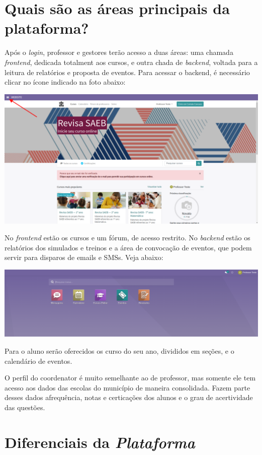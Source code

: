 \section{Quais são as áreas principais da plataforma?}

Após o \textit{login}, professor e gestores terão acesso a duas áreas: uma chamada \textit{frontend}, 
dedicada totalment aos cursos, e outra chada de \textit{backend}, voltada para a leitura de relatórios
e proposta de eventos. Para acessar o backend, é necessário clicar no ícone indicado na foto abaixo:
\medskip


\noindent\includegraphics[width=\textwidth]{imgs/backend.png}\medskip

No \textit{frontend} estão os cursos e um fórum, de acesso restrito.
No \textit{backend} estão os relatórios dos simulados e treinos e a área de 
convocação de eventos, que podem servir para disparos de emails e SMSs.
Veja abaixo:\medskip

\noindent\includegraphics[width=\textwidth]{imgs/backend_home.png}\medskip


Para o aluno serão oferecidos os curso do seu ano, divididos em seções, e o calendário de eventos.

O perfil do coordenator é muito semelhante ao de professor, mas somente ele tem acesso
aos dados das escolas do município de maneira consolidada. Fazem parte desses dados  afrequência, notas e
certicações dos alunos e o grau de acertividade das questões.


\section{Diferenciais da \textit{Plataforma}}

